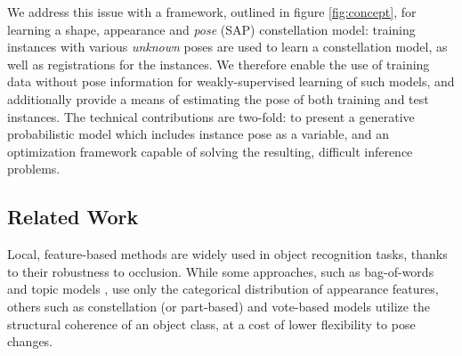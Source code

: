 
We address this issue with a framework, outlined in figure \ref{fig:concept}, for learning a shape, appearance and \emph{pose} (SAP) constellation model: training instances with various \emph{unknown} poses are used to learn a constellation model, as well as registrations for the instances. We therefore enable the use of training data without pose information for weakly-supervised learning of such models, and additionally provide a means of estimating the pose of both training and test instances. The technical contributions are two-fold: to present a generative probabilistic model which includes instance pose as a variable, and an optimization framework capable of solving the resulting, difficult inference problems.


\subsection{Related Work}
\label{sec:relatedwork}

Local, feature-based methods are widely used in object recognition tasks, thanks to their robustness to occlusion. While some approaches, such as bag-of-words \cite{Sivic2005, Fei-Fei2005} and topic models \cite{Fergus2005}, use only the categorical distribution of appearance features, others such as constellation (or part-based) and vote-based models utilize the structural coherence of an object class, at a cost of lower flexibility to pose changes.

